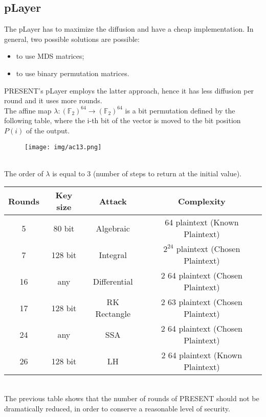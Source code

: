 \documentclass[a4paper, 10pt, titlepage]{article}
\begin{document}
\subsection*{pLayer}
The pLayer has to maximize the diffusion and have a cheap implementation. In general, two possible solutions are possible:
\begin{itemize}
\item to use MDS matrices;
\item to use binary permutation matrices.
\end{itemize}
PRESENT’s pLayer employs the latter approach, hence it has less diffusion per round and it uses more rounds.\\
The affine map $\lambda: (\mathbb{F}_2)^{64} \rightarrow (\mathbb{F}_2)^{64}$ is a bit permutation defined by the following table, where the i-th bit of the vector is moved to the bit
position $P(i)$ of the output.
\begin{figure}[h]
\centering
\texttt{[image: img/ac13.png]}
\end{figure} \\
The order of $\lambda$ is equal to 3 (number of steps to return at the initial value). \medskip \\
\begin{tabular}{|c|c|c|c|}\hline
Rounds & Key size &Attack & Complexity \\ \hline
5 & 80 bit &Algebraic & 64 plaintext (Known Plaintext) \\
7 & 128 bit &Integral & $2^{24}$ plaintext (Chosen Plaintext) \\
16 & any & Differential & 2 64 plaintext (Chosen Plaintext)\\
17 & 128 bit & RK Rectangle & 2 63 plaintext (Chosen Plaintext) \\
24 & any & SSA & 2 64 plaintext (Chosen Plaintext) \\
26 & 128 bit & LH & 2 64 plaintext (Known Plaintext) \\ \hline
\end{tabular} \medskip \\
The previous table shows that the number of rounds of PRESENT should not be dramatically reduced, in order to conserve a reasonable level of security.

\newpage
\end{document}
